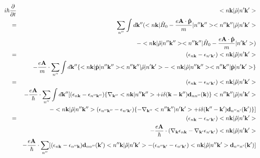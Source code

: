 \documentclass[aps,prb,preprint]{revtex4-1}
\begin{document}
\begin{appendix}
\begin{eqnarray}
i \hbar \frac{ \partial }{\partial t } &&<n{\bf k}| \hat{\rho} |n'{\bf k'}> \nonumber \\
= &&  \sum_{n''} \int d{\bf k''} ( <n{\bf k}| \hat{H}_0 - \frac{e{\bf A} \cdot {\bf \hat{p}} }{m} |n''{\bf k''}><n''{\bf k''}| \hat{\rho} |n'{\bf k'}>  \nonumber \\
&&-<n{\bf k}| \hat{\rho} |n''{\bf k''}><n''{\bf k''}| \hat{H}_0 - \frac{e{\bf A} \cdot {\bf \hat{p}} }{m}  |n'{\bf k'}> )\nonumber \\
= && (\epsilon_{n{\bf k}}-\epsilon_{n'{\bf k'}}) <n{\bf k}| \hat{\rho} |n'{\bf k'}> \nonumber \\
&& -\frac{e{\bf A}}{m} \cdot \sum_{n''} \int d{\bf k''}\{ <n{\bf k}|\hat{\bf p}|n''{\bf k''}> <n''{\bf k''}| \hat{\rho} |n'{\bf k'}> - <n{\bf k}| \hat{\rho} |n''{\bf k''}><n''{\bf k''}|\hat{\bf p} |n'{\bf k'}> \}  \nonumber \\
= && (\epsilon_{n{\bf k}}-\epsilon_{n'{\bf k'}}) <n{\bf k}| \hat{\rho} |n'{\bf k'}> \nonumber  \\
&& -\frac{e{\bf A}}{\hbar} \cdot \sum_{n''} \int d{\bf k''} [(\epsilon_{n{\bf k}}-\epsilon_{n''{\bf k''}})\{\nabla_{\bf k''} <n{\bf k}|n''{\bf k''}> + i \delta({\bf k-k''}) {\bf d}_{nn''}({\bf k})\} <n''{\bf k''}| \hat{\rho} |n'{\bf k'}>\nonumber  \\
&& - <n{\bf k}| \hat{\rho} |n''{\bf k''}>(\epsilon_{n''{\bf k''}}-\epsilon_{n'{\bf k'}})\{-\nabla_{\bf k''} <n''{\bf k''}|n'{\bf k'}> + i \delta({\bf k''-k'}) {\bf d}_{n''n'}({\bf k'})\} ] \nonumber \\
= && (\epsilon_{n{\bf k}}-\epsilon_{n'{\bf k'}}) <n{\bf k}| \hat{\rho} |n'{\bf k'}> \nonumber  \\
&& -\frac{e{\bf A}}{\hbar} \cdot (\nabla_{\bf k} \epsilon_{n{\bf k}} - \nabla_{\bf k'} \epsilon_{n'{\bf k'}}) <n{\bf k}| \hat{\rho} |n'{\bf k'}> \nonumber  \\
&& -\frac{e{\bf A}}{\hbar} \cdot  \sum_{n''} [ (\epsilon_{n{\bf k}}-\epsilon_{n''{\bf k}}) {\bf d}_{nn''}({\bf k'}) <n''{\bf k}| \hat{\rho} |n'{\bf k'}>  -  (\epsilon_{n''{\bf k'}}-\epsilon_{n'{\bf k'}})<n{\bf k}| \hat{\rho} |n''{\bf k'}> {\bf d}_{n''n'}({\bf k'}) ] \nonumber \\
\end{eqnarray}


\end{appendix}
\end{document}
